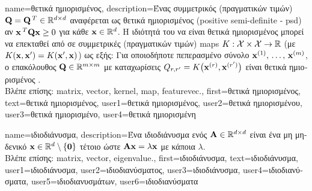 {name={\foreignlanguage{greek}{θετικά ημιορισμένος}},
	description={\foreignlanguage{greek}{Ένας συμμετρικός (πραγματικών τιμών)} \linebreak 
		$\mathbf{Q} = \mathbf{Q}\,^{T} \in \mathbb{R}^{d \times d}$ \foreignlanguage{greek}{αναφέρεται ως θετικά ημιορισμένος} (positive semi-definite - psd) 
		\foreignlanguage{greek}{αν ${\bf x}\,^{T} \mathbf{Q} {\bf x} \geq 0$ για κάθε}  ${\bf x} \in \mathbb{R}^{d}$. 
	 	\foreignlanguage{greek}{Η ιδιότητά του να είναι θετικά ημιορισμένος μπορεί να επεκταθεί από}  \foreignlanguage{greek}{σε 
		συμμετρικές (πραγματικών τιμών)} \gls{map}s  $K: \mathcal{X} \times \mathcal{X} \rightarrow \mathbb{R}$ 
	 	(\foreignlanguage{greek}{με $K({\bf x},{\bf x}') = K({\bf x}',{\bf x})$)
	 	ως εξής: Για οποιοδήποτε πεπερασμένο σύνολο}  ${\bf x}^{(1)}, \,\ldots, \,{\bf x}^{(m)}$, 
	 	\foreignlanguage{greek}{ο επακόλουθος}  $\mathbf{Q} \in \mathbb{R}^{m \times m}$ \foreignlanguage{greek}{με 
		καταχωρίσεις $Q_{r,r'} = K\big({\bf x}^{(r)},{\bf x}^{(r')}\big)$ 
		είναι θετικά ημιορισμένος} \cite{LearningKernelsBook}.\\
		\foreignlanguage{greek}{Βλέπε επίσης:} \gls{matrix}, \gls{vector}, \gls{kernel}, \gls{map}, \gls{featurevec}.},
	first={\foreignlanguage{greek}{θετικά ημιορισμένος}},
	text={\foreignlanguage{greek}{θετικά ημιορισμένος}},
	user1={\foreignlanguage{greek}{θετικά ημιορισμένος}}, %
  	user2={\foreignlanguage{greek}{θετικά ημιορισμένου}}, %
	user3={\foreignlanguage{greek}{θετικά ημιορισμένο}}, %
	user4={\foreignlanguage{greek}{θετικά ημιορισμένη}} %
}

{name={\foreignlanguage{greek}{ιδιοδιάνυσμα}}, 
	description={\foreignlanguage{greek}{Ένα ιδιοδιάνυσμα ενός}  
		$\mathbf{A} \in \mathbb{R}^{d \times d}$ 
		\foreignlanguage{greek}{είναι ένα μη μηδενικό}  ${\bf x} \in \mathbb{R}^{d} \setminus \{ \mathbf{0} \}$ 
		\foreignlanguage{greek}{τέτοιο ώστε $\mathbf{A} {\bf x} = \lambda {\bf x}$ με κάποια}  $\lambda$.\\
		\foreignlanguage{greek}{Βλέπε επίσης:} \gls{matrix}, \gls{vector}, \gls{eigenvalue}.},
	first={\foreignlanguage{greek}{ιδιοδιάνυσμα}},
	text={\foreignlanguage{greek}{ιδιοδιάνυσμα}},
	user1={\foreignlanguage{greek}{ιδιοδιάνυσμα}}, %
	user2={\foreignlanguage{greek}{ιδιοδιανύσματος}}, %
	user3={\foreignlanguage{greek}{ιδιοδιάνυσμα}}, %
	user4={\foreignlanguage{greek}{ιδιοδιανύσματα}}, %
	user5={\foreignlanguage{greek}{ιδιοδιανυσμάτων}}, %
	user6={\foreignlanguage{greek}{ιδιοδιανύσματα}} %
}

